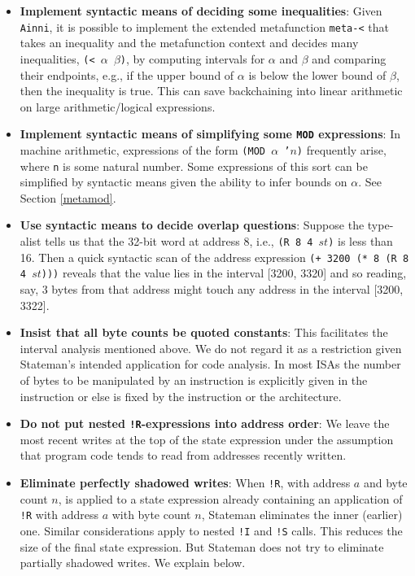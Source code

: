 \documentclass[submission,copyright,creativecommons]{eptcs}
\newcommand{\ptt}[1]{\tt{#1}}
\begin{document}
\begin{itemize}
\item {\bf{Implement syntactic means of deciding some inequalities}}: Given
  {\ptt{Ainni}}, it is possible to implement the extended metafunction
  {\ptt{meta-<}} that takes an inequality and the metafunction context and
  decides many inequalities, {\ptt{(< $\alpha$ $\beta$)}}, by computing
  intervals for $\alpha$ and $\beta$ and comparing their endpoints, e.g., if
  the upper bound of $\alpha$ is below the lower bound of $\beta$, then the
  inequality is true.  This can save backchaining into linear arithmetic on
  large arithmetic/logical expressions.

\item {\bf{Implement syntactic means of simplifying some {\ptt{MOD}}
    expressions}}: In machine arithmetic, expressions of the form {\ptt{(MOD
    $\alpha$ '$n$)}} frequently arise, where {\ptt{n}} is some natural
  number.  Some expressions of this sort can be simplified by syntactic means given
  the ability to infer bounds on $\alpha$.  See Section \ref{metamod}.

\item {\bf{Use syntactic means to decide overlap questions}}: Suppose the type-alist
  tells us that the 32-bit word at address 8, i.e., {\ptt{(R 8 4 $st$)}} is
  less than 16.  Then a quick syntactic scan of the address expression
  {\ptt{(+ 3200 (* 8 (R 8 4 $st$)))}} reveals that the value lies in the
  interval [3200, 3320] and so reading, say, 3 bytes from that address might
  touch any address in the interval [3200, 3322].

\item {\bf{Insist that all byte counts be quoted constants}}: This facilitates the
  interval analysis mentioned above.  We do not regard it as a restriction
  given Stateman's intended application for code analysis.  In most ISAs the
  number of bytes to be manipulated by an instruction is explicitly given in
  the instruction or else is fixed by the instruction or the architecture.

\item {\bf{Do not put nested {\ptt{!R}}-expressions into address order}}: We
  leave the most recent writes at the top of the state expression under the
  assumption that program code tends to read from addresses recently written.

\item {\bf{Eliminate perfectly shadowed writes}}: When {\ptt{!R}}, with address $a$ and
  byte count $n$, is applied to a state expression already containing an application of
  {\ptt{!R}} with address $a$ with byte count $n$, Stateman eliminates the inner (earlier) one.
  Similar considerations apply to nested {\ptt{!I}} and {\ptt{!S}} calls.
  This reduces the size of the final state expression.  But Stateman does not
  try to eliminate partially shadowed writes.  We explain below.


\end{itemize}
\end{document}
